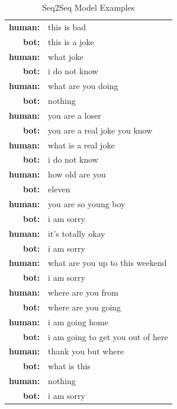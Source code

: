 \documentclass[letterpaper]{article}
\begin{document}
\begin{table}[bt!]
    \centering
    \small
    \caption{\small Seq2Seq Model Examples}
    \begin{tabularx}{0.48\textwidth}{rl}
    	\hline
      \hline
        \textbf{human:} & this is bad \\
	\textbf{bot:} & this is a joke \\
	\textbf{human:} & what joke \\
	\textbf{bot:} & i do not know \\
	\textbf{human:} & what are you doing \\
	\textbf{bot:} & nothing \\
	\hline
	\textbf{human:} & you are a loser\\
	\textbf{bot:} & you are a real joke you know \\
	\textbf{human:} & what is a real joke \\
	\textbf{bot:} & i do not know \\
	\hline
	\textbf{human:} & how old are you \\
	\textbf{bot:} & eleven \\
	\textbf{human:} & you are so young boy \\
	\textbf{bot:} & i am sorry \\
	\textbf{human:} & it's totally okay \\
	\textbf{bot:} & i am sorry \\
	\textbf{human:} & what are you up to this weekend \\
	\textbf{bot:} & i am sorry \\
	\hline
	\textbf{human:} & where are you from \\
	\textbf{bot:} & where are you going \\
	\textbf{human:} & i am going home \\ 
	\textbf{bot:} & i am going to get you out of here \\
	\textbf{human:} & thank you but where \\
	\textbf{bot:} &  what is this \\
	\textbf{human:} & nothing \\
	\textbf{bot:} & i am sorry \\
      \hline
    \end{tabularx}
    \label{table:seq2seq}
\end{table}
\end{document}
